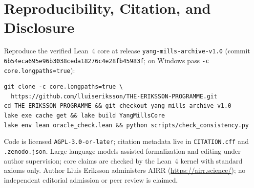 \documentclass[11pt]{article}
\begin{document}
\section{Reproducibility, Citation, and Disclosure}

Reproduce the verified Lean~4 core at release \texttt{yang-mills-archive-v1.0} (commit
\texttt{6b54eca695e96b3038ceda18276c4e28fb45983f}; on Windows pass
\texttt{-c core.longpaths=true}):
\begin{verbatim}
git clone -c core.longpaths=true \
  https://github.com/lluiseriksson/THE-ERIKSSON-PROGRAMME.git
cd THE-ERIKSSON-PROGRAMME && git checkout yang-mills-archive-v1.0
lake exe cache get && lake build YangMillsCore
lake env lean oracle_check.lean && python scripts/check_consistency.py
\end{verbatim}
Code is licensed \texttt{AGPL-3.0-or-later}; citation metadata live in
\texttt{CITATION.cff} and \texttt{.zenodo.json}. Large language models assisted
formalization and editing under author supervision; core claims are checked by the Lean~4
kernel with standard axioms only. Author Lluis Eriksson administers AIRR
(\url{https://airr.science/}); no independent editorial admission or peer review is claimed.
\end{document}
